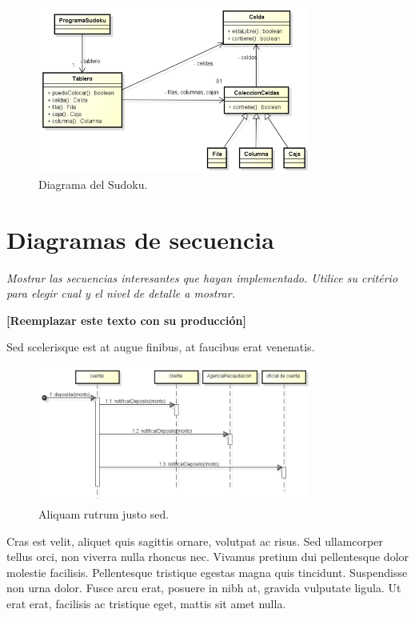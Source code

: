 \documentclass[titlepage,a4paper]{article}
\begin{document}
\begin{figure}[H]
\centering
\includegraphics[width=0.8\textwidth]{diagrama_clase01.png}
\caption{\label{fig:class01}Diagrama del Sudoku.}
\end{figure}

\section{Diagramas de secuencia}\label{sec:diagramasdesecuencia}
\textit{Mostrar las secuencias interesantes que hayan implementado. Utilice su critério para elegir cual y el nivel de detalle a mostrar.}
\newline
\newline
\centerline{\textbf{[Reemplazar este texto con su producción]}}
\newline
\newline
Sed scelerisque est at augue finibus, at faucibus erat venenatis. 

\begin{figure}[H]
\centering
\includegraphics[width=0.8\textwidth]{diagrama_secuencia01.png}
\caption{\label{fig:seq01}Aliquam rutrum justo sed.}
\end{figure}

Cras est velit, aliquet quis sagittis ornare, volutpat ac risus. Sed ullamcorper tellus orci, non viverra nulla rhoncus nec. Vivamus pretium dui pellentesque dolor molestie facilisis. Pellentesque tristique egestas magna quis tincidunt. Suspendisse non urna dolor. Fusce arcu erat, posuere in nibh at, gravida vulputate ligula. Ut erat erat, facilisis ac tristique eget, mattis sit amet nulla.
\end{document}
